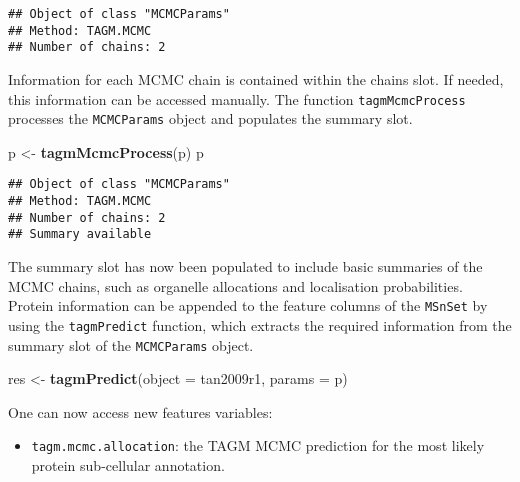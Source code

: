 \documentclass[]{article}
\newenvironment{Shaded}{\begin{snugshade}}{\end{snugshade}}
\newcommand{\KeywordTok}[1]{\textcolor[rgb]{0.13,0.29,0.53}{\textbf{{#1}}}}
\newcommand{\DataTypeTok}[1]{\textcolor[rgb]{0.13,0.29,0.53}{{#1}}}
\newcommand{\StringTok}[1]{\textcolor[rgb]{0.31,0.60,0.02}{{#1}}}
\newcommand{\NormalTok}[1]{{#1}}
\providecommand{\tightlist}{%
  \setlength{\itemsep}{0pt}\setlength{\parskip}{0pt}}
\begin{document}
\begin{verbatim}
## Object of class "MCMCParams"
## Method: TAGM.MCMC 
## Number of chains: 2
\end{verbatim}

Information for each MCMC chain is contained within the chains slot. If
needed, this information can be accessed manually. The function
\texttt{tagmMcmcProcess} processes the \texttt{MCMCParams} object and
populates the summary slot.

\begin{Shaded}
\begin{Highlighting}[]
\NormalTok{p <-}\StringTok{ }\KeywordTok{tagmMcmcProcess}\NormalTok{(p)}
\NormalTok{p}
\end{Highlighting}
\end{Shaded}

\begin{verbatim}
## Object of class "MCMCParams"
## Method: TAGM.MCMC 
## Number of chains: 2 
## Summary available
\end{verbatim}

The summary slot has now been populated to include basic summaries of
the MCMC chains, such as organelle allocations and localisation
probabilities. Protein information can be appended to the feature
columns of the \texttt{MSnSet} by using the \texttt{tagmPredict}
function, which extracts the required information from the summary slot
of the \texttt{MCMCParams} object.

\begin{Shaded}
\begin{Highlighting}[]
\NormalTok{res <-}\StringTok{ }\KeywordTok{tagmPredict}\NormalTok{(}\DataTypeTok{object =} \NormalTok{tan2009r1, }\DataTypeTok{params =} \NormalTok{p)}
\end{Highlighting}
\end{Shaded}

One can now access new features variables:

\begin{itemize}
\tightlist
\item
  \texttt{tagm.mcmc.allocation}: the TAGM MCMC prediction for the most
  likely protein sub-cellular annotation.
\end{itemize}

\begin{Shaded}
\end{Shaded}
\end{document}
